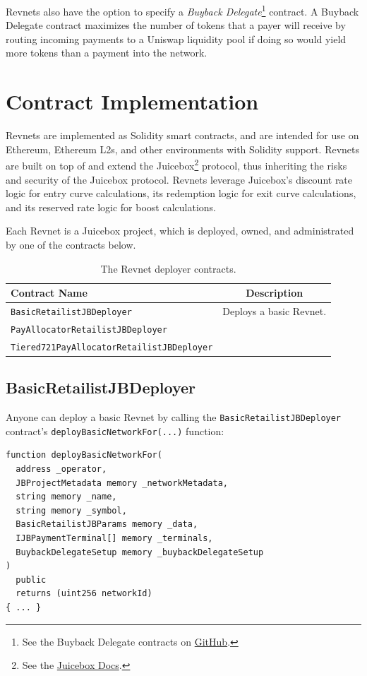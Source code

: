 \documentclass{article}
\begin{document}
Revnets also have the option to specify a \textit{Buyback Delegate}\footnote{See the Buyback Delegate contracts on \href{https://github.com/jbx-protocol/juice-buyback}{GitHub}.} contract. A Buyback Delegate contract maximizes the number of tokens that a payer will receive by routing incoming payments to a Uniswap liquidity pool if doing so would yield more tokens than a payment into the network.

\section{Contract Implementation}

Revnets are implemented as Solidity smart contracts, and are intended for use on Ethereum, Ethereum L2s,  and other environments with Solidity support. Revnets are built on top of and extend the Juicebox\footnote{See the \href{https://docs.juicebox.money}{Juicebox Docs}.} protocol, thus inheriting the risks and security of the Juicebox protocol. Revnets leverage Juicebox's discount rate logic for entry curve calculations, its redemption logic for exit curve calculations, and its reserved rate logic for boost calculations.

Each Revnet is a Juicebox project, which is deployed, owned, and administrated by one of the contracts below.

\begin{table}[h]
  \centering
  \begin{tabular}{|l|c|}
    \hline
    Contract Name & Description \\
    \hline
    \texttt{BasicRetailistJBDeployer} & Deploys a basic Revnet. \\
    \hline
    \texttt{PayAllocatorRetailistJBDeployer} & \\
    \hline
    \texttt{Tiered721PayAllocatorRetailistJBDeployer} & \\
    \hline
  \end{tabular}
  \caption{The Revnet deployer contracts.}
\end{table}

\subsection{BasicRetailistJBDeployer}

Anyone can deploy a basic Revnet by calling the \texttt{BasicRetailistJBDeployer} contract's \texttt{deployBasicNetworkFor(...)} function:

\begin{lstlisting}[language=Solidity]
function deployBasicNetworkFor(
  address _operator,
  JBProjectMetadata memory _networkMetadata,
  string memory _name,
  string memory _symbol,
  BasicRetailistJBParams memory _data,
  IJBPaymentTerminal[] memory _terminals,
  BuybackDelegateSetup memory _buybackDelegateSetup
)
  public
  returns (uint256 networkId)
{ ... }
\end{lstlisting}
\end{document}
